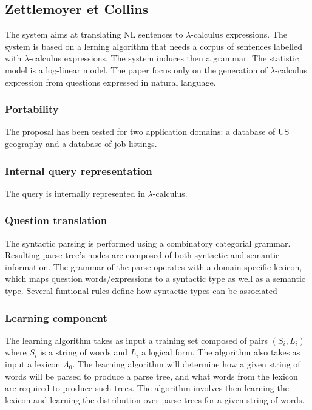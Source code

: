 \documentclass[10pt,journal,letterpaper,compsoc]{IEEEtran}
\begin{document}
\subsection{Zettlemoyer et Collins~\cite{DBLP:conf/uai/ZettlemoyerC05}}
The system aims at translating NL sentences to $\lambda$-calculus expressions.
The system is based on a lerning algorithm that needs a corpus of sentences
labelled with $\lambda$-calculus expressions. The system induces then a grammar.
The statistic model is a log-linear model.
The paper focus only on the generation of $\lambda$-calculus expression from
questions expressed in natural language.


\subsubsection{Portability}
The proposal has been tested for two application domains: a database of US
geography and a database of job listings.

\subsubsection{Internal query representation}
The query is internally represented in $\lambda$-calculus.

\subsubsection{Question translation}
The syntactic parsing is performed using a combinatory categorial grammar.
Resulting parse tree's nodes are composed of both syntactic and semantic
information.
The grammar of the parse operates with a domain-specific lexicon, which maps
question words/expressions to a syntactic type as well as a semantic type.
Several funtional rules define how syntactic types can be associated

\subsubsection{Learning component}
The learning algorithm takes as input a training set composed of pairs
$(S_i,L_i)$ where $S_i$ is a string of words and $L_i$ a logical form. The
algorithm also takes as input a lexicon $\Lambda_0$.
The learning algorithm will determine how a given string of words will be parsed
to produce a parse tree, and what words from the lexicon are required to produce
such trees. The algorithm involves then learning the lexicon and learning
the distribution over parse trees for a given string of words.
\end{document}
